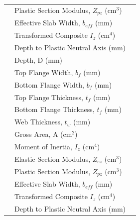 \documentclass[12pt,a4paper]{report}
\numberwithin{figure}{chapter}
\begin{document}
\begin{longtable}{|C{3.95cm}|L{6.55cm}|C{3.63cm}|}
 & Plastic Section Modulus, $Z_{pz}$ (cm$^3$) &  \\*
 & Effective Slab Width, $b_{eff}$ (mm) &  \\*
 & Transformed Composite $I_z$ (cm$^4$) &  \\*
 & Depth to Plastic Neutral Axis (mm) &  \\
\hline
{}
 & Depth, D (mm) &  \\*
 & Top Flange Width, $b_f$ (mm) &  \\*
 & Bottom Flange Width, $b_f$ (mm) &  \\*
 & Top Flange Thickness, $t_f$ (mm) &  \\*
 & Bottom Flange Thickness, $t_f$ (mm) &  \\*
 & Web Thickness, $t_w$ (mm) &  \\*
 & Gross Area, A (cm$^2$) &  \\*
 & Moment of Inertia, $I_z$ (cm$^4$) &  \\*
 & Elastic Section Modulus, $Z_{ez}$ (cm$^3$) &  \\*
 & Plastic Section Modulus, $Z_{pz}$ (cm$^3$) &  \\*
 & Effective Slab Width, $b_{eff}$ (mm) &  \\*
 & Transformed Composite $I_z$ (cm$^4$) &  \\*
 & Depth to Plastic Neutral Axis (mm) &  \\
\hline
\end{longtable}
\end{document}
